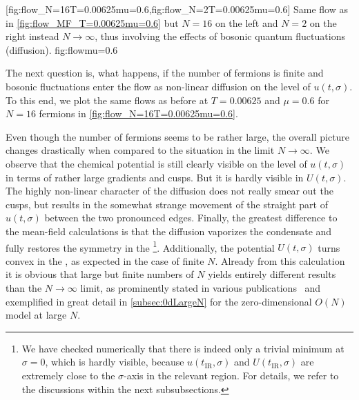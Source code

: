 	[fig:flow_N=16T=0.00625mu=0.6,fig:flow_N=2T=0.00625mu=0.6] %
	{%
		Same \frg{} flow as in \cref{fig:flow_MF_T=0.00625mu=0.6} but $N = 16$ on the left   and $N=2$ on the right  instead $N\rightarrow\infty$, thus involving the effects of bosonic quantum fluctuations (diffusion).
	}%
	{fig:flowmu=0.6}%
	
The next question is, what happens, if the number of fermions is finite and bosonic fluctuations enter the \frg{} flow as non-linear diffusion on the level of $u ( t, \sigma )$. To this end, we plot the same \frg{} flows as before at $T = 0.00625$ and $\mu = 0.6$ for $N = 16$ fermions in \cref{fig:flow_N=16T=0.00625mu=0.6}.

Even though the number of fermions seems to be rather large, the overall picture changes drastically when compared to the situation in the limit $N\rightarrow\infty$. We observe that the chemical potential is still clearly visible on the level of $u ( t, \sigma )$ in terms of rather large gradients and cusps. But it is hardly visible in $U ( t, \sigma )$. The highly non-linear character of the diffusion does not really smear out the cusps, but results in the somewhat strange movement of the straight part of $u ( t, \sigma )$ between the two pronounced edges. Finally, the greatest difference to the mean-field calculations is that the diffusion vaporizes the condensate and fully restores the \ZII{} symmetry in the \ir{}\footnote{We have checked numerically that there is indeed only a trivial minimum at $\sigma = 0$, which is hardly visible, because $u ( t_\mathrm{IR}, \sigma )$ and $U ( t_\mathrm{IR}, \sigma )$ are extremely close to the $\sigma$-axis in the relevant region. For details, we refer to the discussions within the next subsubsections.}. Additionally, the potential $U ( t, \sigma )$ turns convex in the \ir{}, as expected in the case of finite $N$. Already from this calculation it is obvious that large but finite numbers of $N$ yields entirely different results than the $N \rightarrow \infty$ limit, as prominently stated in various publications~\cite{Witten:1978qu,ZinnJustin:2002ru,Rosenstein:1990nm} and exemplified in great detail in \cref{subsec:0dLargeN} for the zero-dimensional $O(N)$ model at large $N$.\bigskip

